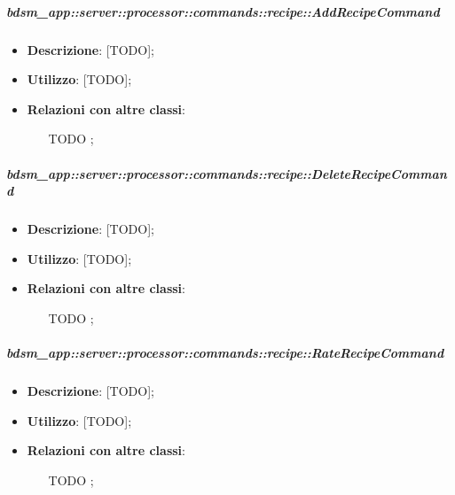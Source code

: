         \subparagraph{bdsm\_app::server::processor::commands::recipe::AddRecipeCommand} %
        \label{subp:bdsm_app_server_processor_commands_recipe_addrecipecommand}
        \begin{itemize}
          \item \textbf{Descrizione}: [TODO];
          \item \textbf{Utilizzo}: [TODO];
          \item \textbf{Relazioni con altre classi}:
            \begin{itemize}
              \item [TODO];
            \end{itemize}
        \end{itemize}

        \subparagraph{bdsm\_app::server::processor::commands::recipe::DeleteRecipeCommand} %
        \label{subp:bdsm_app_server_processor_commands_recipe_deleterecipecommand}
        \begin{itemize}
          \item \textbf{Descrizione}: [TODO];
          \item \textbf{Utilizzo}: [TODO];
          \item \textbf{Relazioni con altre classi}:
            \begin{itemize}
              \item [TODO];
            \end{itemize}
        \end{itemize}

        \subparagraph{bdsm\_app::server::processor::commands::recipe::RateRecipeCommand} %
        \label{subp:bdsm_app_server_processor_commands_recipe_raterecipecommand}
        \begin{itemize}
          \item \textbf{Descrizione}: [TODO];
          \item \textbf{Utilizzo}: [TODO];
          \item \textbf{Relazioni con altre classi}:
            \begin{itemize}
              \item [TODO];
            \end{itemize}
        \end{itemize}


